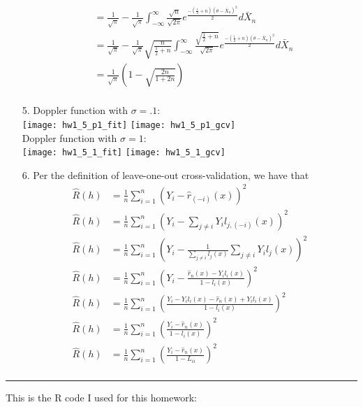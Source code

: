 \documentclass[11pt]{article}
\theoremstyle{definition}
\begin{document}
\begin{itemize}
\begin{align*}
            &=\frac{1}{\sqrt{\pi}} - \frac{1}{\sqrt{\pi}}\int_{-\infty}^\infty \frac{\sqrt{n}}{\sqrt{2\pi}} e^{\frac{-(\frac{1}{2}+n)(\theta-\bar X_n)^2}{2}} d\bar X_n \\
            &=\frac{1}{\sqrt{\pi}} - \frac{1}{\sqrt{\pi}}\sqrt{\frac{n}{\frac{1}{2}+n}}\int_{-\infty}^\infty \frac{\sqrt{\frac{1}{2}+n}}{\sqrt{2\pi}} e^{\frac{-(\frac{1}{2}+n)(\theta-\bar X_n)^2}{2}} d\bar X_n \\
            &=\frac{1}{\sqrt{\pi}}\left(1 - \sqrt{\frac{2n}{1+2n}} \right)\\
        \end{align*}
    \item[5.]
        Doppler function with $\sigma=.1$: \\
        \texttt{[image: hw1\_5\_p1\_fit]} 
        \texttt{[image: hw1\_5\_p1\_gcv]} \\
        Doppler function with $\sigma=1$: \\
        \texttt{[image: hw1\_5\_1\_fit]} 
        \texttt{[image: hw1\_5\_1\_gcv]} \\


    \item[6.]
        Per the definition of leave-one-out cross-validation, we have that
        \begin{align*}
            \hat R(h) &= \frac{1}{n} \sum_{i=1}^n \left(Y_i-\hat r_{(-i)}(x) \right )^2 \\
            \hat R(h) &= \frac{1}{n} \sum_{i=1}^n \left(Y_i-\sum_{j\neq i} Y_i l_{j,(-i)} (x)  \right )^2 \\
            \hat R(h) &= \frac{1}{n} \sum_{i=1}^n \left(Y_i- \frac{1}{\sum_{j\neq i} l_{j}(x)} \sum_{j\neq i} Y_i l_{j} (x)  \right )^2 \\
            \hat R(h) &= \frac{1}{n} \sum_{i=1}^n \left(Y_i- \frac{\hat r_n (x) - Y_i l_{i}(x)}{1- l_{i}(x)} \right )^2 \\
            \hat R(h) &= \frac{1}{n} \sum_{i=1}^n \left(\frac{Y_i - Y_i l_{i}(x) - \hat r_n (x) + Y_i l_{i}(x)}{1- l_{i}(x)} \right )^2 \\
            \hat R(h) &= \frac{1}{n} \sum_{i=1}^n \left(\frac{Y_i -\hat r_n (x) }{1- l_{i}(x)} \right )^2 \\
            \hat R(h) &= \frac{1}{n} \sum_{i=1}^n \left(\frac{Y_i -\hat r_n (x) }{1- L_{ii}} \right )^2 \\
        \end{align*}

\end{itemize}
\hrule
\vspace{2mm}
This is the R code I used for this homework:

\end{document}
